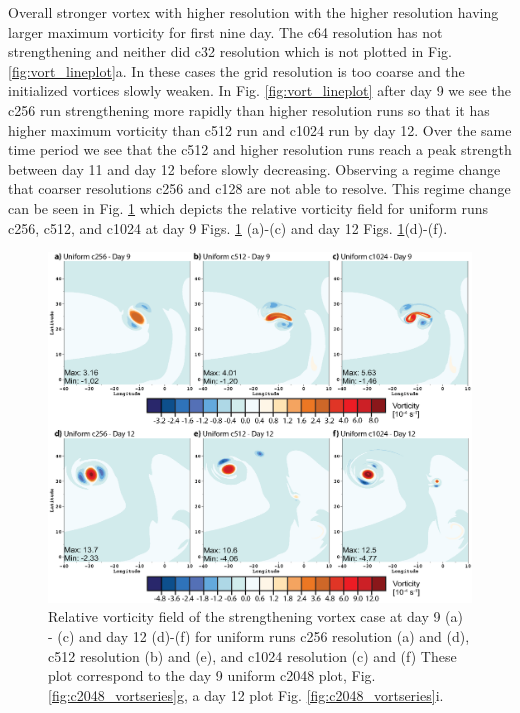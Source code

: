 Overall stronger vortex with higher resolution with the higher resolution having larger
maximum vorticity for first nine day. The c64 resolution has not strengthening and 
neither did c32 resolution which is not plotted in Fig. \ref{fig:vort_lineplot}a. 
In these cases the grid resolution is
too coarse and the initialized vortices slowly weaken.
In Fig. \ref{fig:vort_lineplot} after day 9 we see the c256 run strengthening 
more rapidly than higher resolution runs so
that it has higher maximum vorticity than c512 run and c1024 run by day 12.  Over the same time 
period we see that the c512 and higher resolution runs reach a peak strength between day 11 and day 12
before slowly decreasing. Observing a regime change that coarser resolutions c256 and c128 are not
able to resolve. This regime change can be seen in Fig. \ref{fig:uni_d9nd12} which 
depicts the relative vorticity field for uniform runs c256, c512, and c1024 at day 9 
Figs. \ref{fig:uni_d9nd12} (a)-(c) and day 12 Figs. \ref{fig:uni_d9nd12}(d)-(f).

\begin{figure}
   \centerline{%
   \noindent
   \includegraphics[width=\textwidth]{Chap2/uni_runs_day9n12-01}}
   \caption{Relative vorticity field of the 
   strengthening vortex case at day 9 (a) - (c) and day 12 (d)-(f) for uniform runs 
   c256 resolution (a) and (d), c512 resolution (b) and (e), and 
   c1024 resolution (c) and (f) These plot
   correspond to the day 9 uniform c2048 plot, Fig. \ref{fig:c2048_vortseries}g, a
   day 12 plot Fig. \ref{fig:c2048_vortseries}i.
   }
   \label{fig:uni_d9nd12}
\end{figure}

